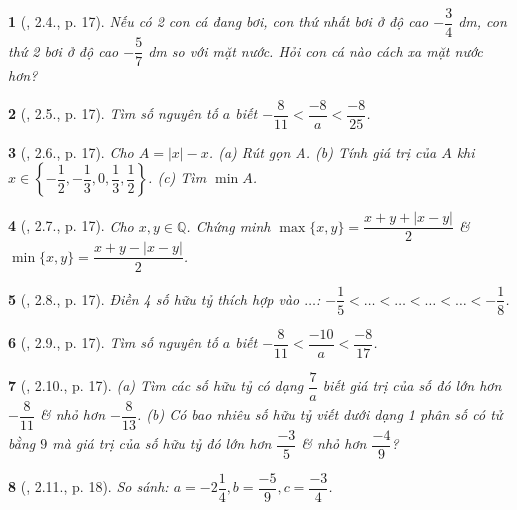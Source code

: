 \documentclass{article}
\newtheorem{baitoan}{}
\begin{document}
\begin{baitoan}[\cite{Binh_boi_duong_Toan_7_tap_1}, 2.4., p. 17]
	Nếu có 2 con cá đang bơi, con thứ nhất bơi ở độ cao $-\dfrac{3}{4}$ {\rm dm}, con thứ 2 bơi ở độ cao $-\dfrac{5}{7}$ {\rm dm} so với mặt nước. Hỏi con cá nào cách xa mặt nước hơn?
\end{baitoan}

\begin{baitoan}[\cite{Binh_boi_duong_Toan_7_tap_1}, 2.5., p. 17]
	Tìm số nguyên tố $a$ biết $-\dfrac{8}{11} < \dfrac{-8}{a} < \dfrac{-8}{25}$.
\end{baitoan}

\begin{baitoan}[\cite{Binh_boi_duong_Toan_7_tap_1}, 2.6., p. 17]
	Cho $A = |x| - x$. (a) Rút gọn A. (b) Tính giá trị của $A$ khi $x\in\left\{-\dfrac{1}{2},-\dfrac{1}{3},0,\dfrac{1}{3},\dfrac{1}{2}\right\}$. (c) Tìm $\min A$.
\end{baitoan}

\begin{baitoan}[\cite{Binh_boi_duong_Toan_7_tap_1}, 2.7., p. 17]
	Cho $x,y\in\mathbb{Q}$. Chứng minh $\max\{x,y\} = \dfrac{x + y + |x - y|}{2}$ \& $\min\{x,y\} = \dfrac{x + y -|x - y|}{2}$.
\end{baitoan}

\begin{baitoan}[\cite{Binh_boi_duong_Toan_7_tap_1}, 2.8., p. 17]
	Điền 4 số hữu tỷ thích hợp vào $\ldots$: $-\dfrac{1}{5} < \ldots < \ldots < \ldots < \ldots < -\dfrac{1}{8}$.
\end{baitoan}

\begin{baitoan}[\cite{Binh_boi_duong_Toan_7_tap_1}, 2.9., p. 17]
	Tìm số nguyên tố $a$ biết $-\dfrac{8}{11} < \dfrac{-10}{a} < \dfrac{-8}{17}$.
\end{baitoan}

\begin{baitoan}[\cite{Binh_boi_duong_Toan_7_tap_1}, 2.10., p. 17]
	(a) Tìm các số hữu tỷ có dạng $\dfrac{7}{a}$ biết giá trị của số đó lớn hơn $-\dfrac{8}{11}$ \& nhỏ hơn $-\dfrac{8}{13}$. (b) Có bao nhiêu số hữu tỷ viết dưới dạng 1 phân số có tử bằng $9$ mà giá trị của số hữu tỷ đó lớn hơn $\dfrac{-3}{5}$ \& nhỏ hơn $\dfrac{-4}{9}$?
\end{baitoan}

\begin{baitoan}[\cite{Binh_boi_duong_Toan_7_tap_1}, 2.11., p. 18]
	So sánh: $a = -2\dfrac{1}{4},b = \dfrac{-5}{9},c = \dfrac{-3}{4}$.
\end{baitoan}
\end{document}
